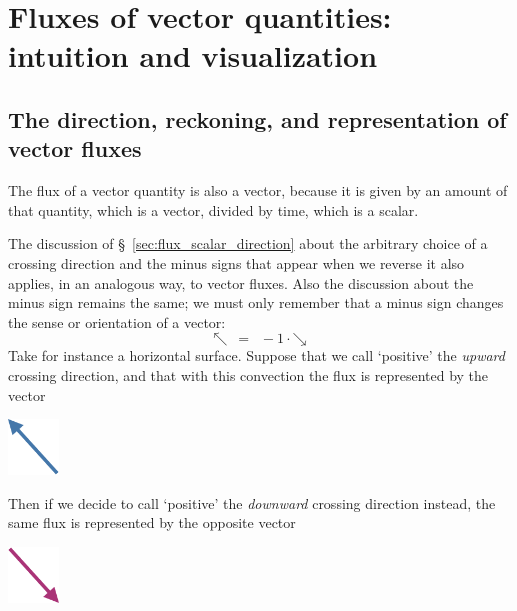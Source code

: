 \documentclass[a4paper,12pt,%
onecolumn,oneside,titlepage,%
british%
]{memoir}
\renewcommand*{\|}[1][]{\nonscript\:#1\vert\nonscript\:\mathopen{}}
\newcommand*{\sect}{\S}%
\begin{document}
\section{Fluxes of vector quantities: intuition and visualization}
\label{sec:intuition_fluxes_vector}

\subsection{The direction, reckoning, and representation of vector fluxes}
\label{sec:flux_vector_direction}

The flux of a vector quantity is also a vector, because it is given by an amount of that quantity, which is a vector, divided by time, which is a scalar.

The discussion of \sect~\ref{sec:flux_scalar_direction} about the arbitrary choice of a crossing direction and the minus signs that appear when we reverse it also applies, in an analogous way, to vector fluxes. Also the discussion about the minus sign remains the same; we must only remember that a minus sign changes the sense or orientation of a vector:
\begin{equation*}
  \mathord{\nwarrow} \mathrel{\enspace=\enspace} -1\cdot\mathord{\searrow}
\end{equation*}
Take for instance a horizontal surface. Suppose that we call \enquote*{positive} the \emph{upward} crossing direction, and that with this convection the flux is represented by the vector
\begin{center}
  \includegraphics[height=4em]{vec_NW.pdf}
\end{center}
Then if we decide to call \enquote*{positive} the \emph{downward} crossing direction instead, the same flux is represented by the opposite vector
\begin{center}
  \includegraphics[height=4em]{vec_SE.pdf}
\end{center}
\end{document}
